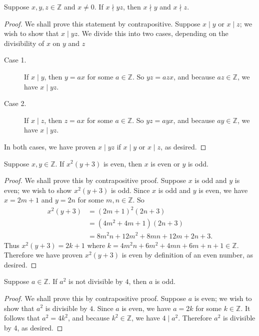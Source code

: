 \documentclass{exam}
\begin{document}
\begin{proposition}{5.10}
    Suppose $x,y,z\in\mathbb Z$ and $x\neq 0$. If $x\nmid yz$, then $x\nmid y$ and $x\nmid z$.
\end{proposition}

\begin{proof}
    We shall prove this statement by contrapositive. Suppose $x\mid y$ or $x\mid z$; we wish to show that $x\mid yz$. We divide this into two cases, depending on the divisibility of $x$ on $y$ and $z$
    \begin{description}
        \item[Case 1. ] If $x\mid y$, then $y=ax$ for some $a\in\mathbb Z$. So $yz = azx$, and because $az \in\mathbb Z$, we have $x\mid yz$.
        \item[Case 2. ] If $x\mid z$, then $z = ax$ for some $a\in\mathbb Z$. So $yz = ayx$, and because $ay\in\mathbb Z$, we have $x \mid yz$.
    \end{description}
    
    In both cases, we have proven $x\mid yz$ if $x\mid y$ or $x\mid z$, as desired.
\end{proof}

\begin{proposition}{5.11}
    Suppose $x, y\in\mathbb Z$. If $x^2(y+3)$ is even, then $x$ is even or $y$ is odd.
\end{proposition}

\begin{proof}
    We shall prove this by contrapositive proof. Suppose $x$ is odd and $y$ is even; we wish to show $x^2(y+3)$ is odd. Since $x$ is odd and $y$ is even, we have $x = 2m+1$ and $y=2n$ for some $m,n\in\mathbb Z$. So 
    \begin{align*}
        x^2(y+3)&=(2m+1)^2(2n+3)\\
        &=(4m^2+4m+1)(2n+3)\\
        &=8m^2n+12m^2+8mn+12m+2n+3.
    \end{align*}
    Thus $x^2(y+3) = 2k+1$ where $k=4m^2n+6m^2+4mn+6m+n+1\in\mathbb Z$. Therefore we have proven $x^2(y+3)$ is even by definition of an even number, as desired.
\end{proof}

\begin{proposition}{5.12}
    Suppose $a\in\mathbb Z$. If $a^2$ is not divisible by $4$, then $a$ is odd.
\end{proposition}

\begin{proof}
    We shall prove this by contrapositive proof. Suppose $a$ is even; we wish to show that $a^2$ is divisible by $4$. Since $a$ is even, we have $a = 2k$ for some $k\in\mathbb Z$. It follows that $a^2 = 4k^2$, and because $k^2\in\mathbb Z$, we have $4\mid a^2$. Therefore $a^2$ is divisible by 4, as desired.
\end{proof}
\end{document}
